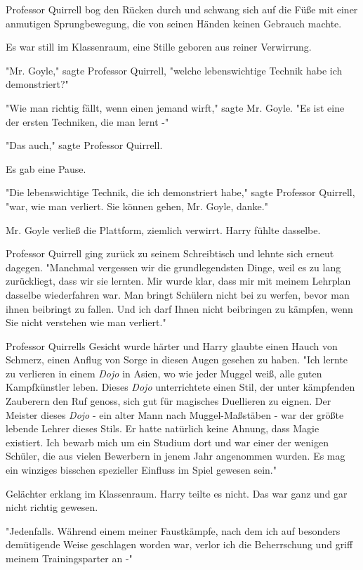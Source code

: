 {Professor Quirrell bog den Rücken durch und schwang sich auf die Füße mit einer anmutigen Sprungbewegung, die von seinen Händen keinen Gebrauch machte.

Es war still im Klassenraum, eine Stille geboren aus reiner Verwirrung.

"Mr. Goyle," sagte Professor Quirrell, "welche lebenswichtige Technik habe ich demonstriert?"

"Wie man richtig fällt, wenn einen jemand wirft," sagte Mr. Goyle. "Es ist eine der ersten Techniken, die man lernt -"

"Das auch," sagte Professor Quirrell.

Es gab eine Pause.

"Die lebenswichtige Technik, die ich demonstriert habe," sagte Professor Quirrell, "war, wie man verliert. Sie können gehen, Mr. Goyle, danke."

Mr. Goyle verließ die Plattform, ziemlich verwirrt. Harry fühlte dasselbe.

Professor Quirrell ging zurück zu seinem Schreibtisch und lehnte sich erneut dagegen. "Manchmal vergessen wir die grundlegendsten Dinge, weil es zu lang zurückliegt, dass wir sie lernten. Mir wurde klar, dass mir mit meinem Lehrplan dasselbe wiederfahren war. Man bringt Schülern nicht bei zu werfen, bevor man ihnen beibringt zu fallen. Und ich darf Ihnen nicht beibringen zu kämpfen, wenn Sie nicht verstehen wie man verliert."

Professor Quirrells Gesicht wurde härter und Harry glaubte einen Hauch von Schmerz, einen Anflug von Sorge in diesen Augen gesehen zu haben. "Ich lernte zu verlieren in einem \emph{Dojo} in Asien, wo wie jeder Muggel weiß, alle guten Kampfkünstler leben. Dieses \emph{Dojo} unterrichtete einen Stil, der unter kämpfenden Zauberern den Ruf genoss, sich gut für magisches Duellieren zu eignen. Der Meister dieses \emph{Dojo} - ein alter Mann nach Muggel-Maßstäben - war der größte lebende Lehrer dieses Stils. Er hatte natürlich keine Ahnung, dass Magie existiert. Ich bewarb mich um ein Studium dort und war einer der wenigen Schüler, die aus vielen Bewerbern in jenem Jahr angenommen wurden. Es mag ein winziges bisschen spezieller Einfluss im Spiel gewesen sein."

Gelächter erklang im Klassenraum. Harry teilte es nicht. Das war ganz und gar nicht richtig gewesen.

"Jedenfalls. Während einem meiner Faustkämpfe, nach dem ich auf besonders demütigende Weise geschlagen worden war, verlor ich die Beherrschung und griff meinem Trainingsparter an -"

}
